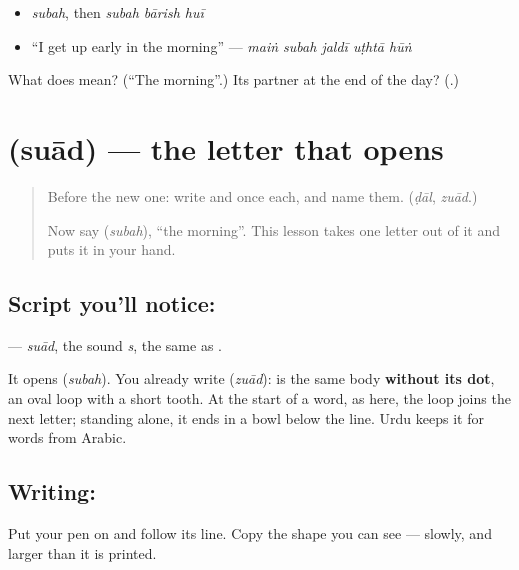 \begin{itemize}
\raggedright
  \item \emph{subah}, then \emph{subah bārish huī}
  \item \textquotedblleft{}I get up early in the morning\textquotedblright{} — \emph{maiṅ subah jaldī uṭhtā hūṅ}
\end{itemize}

\begin{tcolorbox}[breakable,colback=teal!4,colframe=teal!35!black,title={Before you move on}]
What does \textbf{} mean? (\textquotedblleft{}The morning\textquotedblright{}.) Its partner at the end of the day? (\textbf{}.)
\end{tcolorbox}
\section[\texorpdfstring{\ur{ص} (suād)}{ص (suād)}]{ (suād) — the letter that opens }

\label{lesson:UR-W273-suad}



\begin{quote}
Before the new one: write  and  once each, and name them. (\emph{ḍāl}, \emph{zuād}.)

Now say \textbf{} (\emph{subah}), \textquotedblleft{}the morning\textquotedblright{}. This lesson takes one letter out of it and puts it in your hand.
\end{quote}

\subsection*{Script you'll notice: }
\textbf{} — \emph{suād}, the sound \emph{s}, the same as \textbf{}.

It opens \textbf{} (\emph{subah}). You already write \textbf{} (\emph{zuād}): \textbf{} is the same body \textbf{without its dot}, an oval loop with a short tooth. At the start of a word, as here, the loop joins the next letter; standing alone, it ends in a bowl below the line. Urdu keeps it for words from Arabic.

\subsection*{Writing: }
Put your pen on  and follow its line. Copy the shape you can see — slowly, and larger than it is printed.

